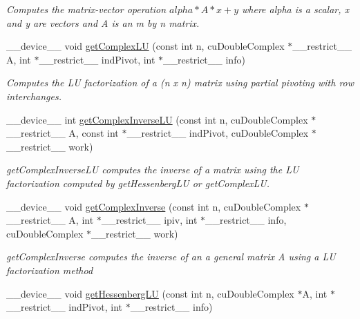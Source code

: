 \begin{DoxyCompactItemize}
\begin{DoxyCompactList}\small\item\em Computes the matrix-\/vector operation $alpha*A*x + y$ where alpha is a scalar, x and y are vectors and A is an m by n matrix. \end{DoxyCompactList}\item 
\+\_\+\+\_\+device\+\_\+\+\_\+ void \hyperlink{complexInverse_8cu_a241fad7ccf21bf3c76f0e8f2235f9897}{get\+Complex\+LU} (const int n, cu\+Double\+Complex $\ast$\+\_\+\+\_\+restrict\+\_\+\+\_\+ A, int $\ast$\+\_\+\+\_\+restrict\+\_\+\+\_\+ ind\+Pivot, int $\ast$\+\_\+\+\_\+restrict\+\_\+\+\_\+ info)
\begin{DoxyCompactList}\small\item\em Computes the LU factorization of a (n x n) matrix using partial pivoting with row interchanges. \end{DoxyCompactList}\item 
\+\_\+\+\_\+device\+\_\+\+\_\+ int \hyperlink{complexInverse_8cu_a33967d9901cc0d473f2ce9fdef02330e}{get\+Complex\+Inverse\+LU} (const int n, cu\+Double\+Complex $\ast$\+\_\+\+\_\+restrict\+\_\+\+\_\+ A, const int $\ast$\+\_\+\+\_\+restrict\+\_\+\+\_\+ ind\+Pivot, cu\+Double\+Complex $\ast$\+\_\+\+\_\+restrict\+\_\+\+\_\+ work)
\begin{DoxyCompactList}\small\item\em get\+Complex\+Inverse\+LU computes the inverse of a matrix using the LU factorization computed by get\+Hessenberg\+LU or get\+Complex\+LU. \end{DoxyCompactList}\item 
\+\_\+\+\_\+device\+\_\+\+\_\+ void \hyperlink{complexInverse_8cu_a3afc82e5f26795c2a629efdfbfb0cc5d}{get\+Complex\+Inverse} (const int n, cu\+Double\+Complex $\ast$\+\_\+\+\_\+restrict\+\_\+\+\_\+ A, int $\ast$\+\_\+\+\_\+restrict\+\_\+\+\_\+ ipiv, int $\ast$\+\_\+\+\_\+restrict\+\_\+\+\_\+ info, cu\+Double\+Complex $\ast$\+\_\+\+\_\+restrict\+\_\+\+\_\+ work)
\begin{DoxyCompactList}\small\item\em get\+Complex\+Inverse computes the inverse of an a general matrix A using a LU factorization method \end{DoxyCompactList}\item 
\+\_\+\+\_\+device\+\_\+\+\_\+ void \hyperlink{complexInverse_8cu_a2a51f149a6ed728b322071b39fc49ba9}{get\+Hessenberg\+LU} (const int n, cu\+Double\+Complex $\ast$A, int $\ast$\+\_\+\+\_\+restrict\+\_\+\+\_\+ ind\+Pivot, int $\ast$\+\_\+\+\_\+restrict\+\_\+\+\_\+ info)

\end{DoxyCompactItemize}
